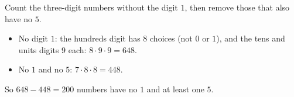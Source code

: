 Count the three-digit numbers without the digit $1$, then remove those that also have no $5$.
\begin{itemize}
\item No digit $1$: the hundreds digit has $8$ choices (not $0$ or $1$), and the tens and units digits $9$ each: $8\cdot9\cdot9=648$.
\item No $1$ and no $5$: $7\cdot8\cdot8=448$.
\end{itemize}
So $648-448=\boxed{200}$ numbers have no $1$ and at least one $5$.
